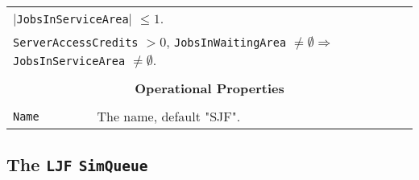 \documentclass[12pt]{book}
\begin{document}
\begin{tabular}{|l|l|l|l|}
\multicolumn{4}{|l|}{$|$\lstinline|JobsInServiceArea|$|$ $\leq 1$.} \\
\multicolumn{4}{|l|}{\lstinline|ServerAccessCredits| $> 0$, \lstinline|JobsInWaitingArea| $\neq \emptyset
                     \Rightarrow$ \lstinline|JobsInServiceArea| $\neq \emptyset$.} \\
\hline
\multicolumn{4}{|c|}{} \\
\multicolumn{4}{|c|}{\bf Operational Properties} \\
\multicolumn{4}{|c|}{} \\
\hline
\lstinline|Name| & \multicolumn{3}{|l|}{The name, default "SJF".} \\
\hline
\end{tabular}

\subsection{The \lstinline{LJF} \lstinline{SimQueue}}
 
\end{document}
